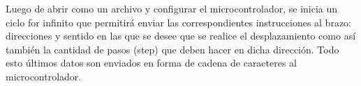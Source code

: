 Luego de abrir como un archivo y configurar el microcontrolador, se inicia un ciclo for infinito que 
permitirá enviar las correspondientes instrucciones al brazo: direcciones y sentido en las que se desee 
que se realice el desplazamiento como así también la cantidad de pasos (step) que deben hacer en dicha dirección.
Todo esto últimos datos son enviados en forma de cadena de caracteres al microcontrolador.
